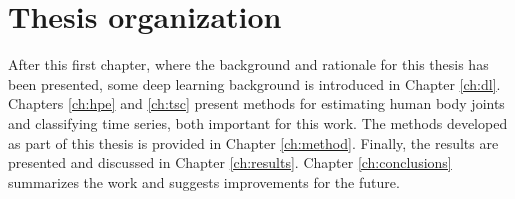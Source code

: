 \section{Thesis organization}
After this first chapter, where the background and rationale for this thesis has been presented, some deep learning background is introduced in Chapter \ref{ch:dl}. Chapters \ref{ch:hpe} and \ref{ch:tsc} present methods for estimating human body joints and classifying time series, both important for this work. The methods developed as part of this thesis is provided in Chapter \ref{ch:method}. Finally, the results are presented and discussed in Chapter \ref{ch:results}. Chapter \ref{ch:conclusions} summarizes the work and suggests improvements for the future.

%
%
